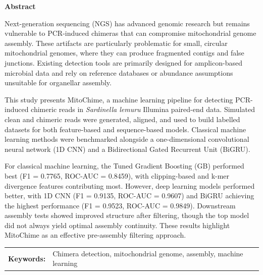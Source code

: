 
\begin{center}
\textbf{Abstract}
\end{center}

\setlength{\parindent}{0pt}
Next-generation sequencing (NGS) has advanced genomic research but remains vulnerable to PCR-induced chimeras that can compromise mitochondrial genome assembly. These artifacts are particularly problematic for small, circular mitochondrial genomes, where they can produce fragmented contigs and false junctions. Existing detection tools are primarily designed for amplicon-based microbial data and rely on reference databases or abundance assumptions unsuitable for organellar assembly.

This study presents MitoChime, a machine learning pipeline for detecting PCR-induced chimeric reads in \textit{Sardinella lemuru} Illumina paired-end data. Simulated clean and chimeric reads were generated, aligned, and used to build labelled datasets for both feature-based and sequence-based models. Classical machine learning methods were benchmarked alongside a one-dimensional convolutional neural network (1D CNN) and a Bidirectional Gated Recurrent Unit (BiGRU).

For classical machine learning, the Tuned Gradient Boosting (GB) performed best (F1 = 0.7765, ROC-AUC = 0.8459), with clipping-based and k-mer divergence features contributing most. However, deep learning models performed better, with 1D CNN (F1 = 0.9135, ROC-AUC = 0.9607) and BiGRU achieving the highest performance (F1 = 0.9523, ROC-AUC = 0.9849). Downstream assembly tests showed improved structure after filtering, though the top model did not always yield optimal assembly continuity. These results highlight MitoChime as an effective pre-assembly filtering approach.

\begin{tabular}{lp{4.25in}}
\hspace{-0.5em}\textbf{Keywords:}\hspace{0.25em} & Chimera detection, mitochondrial genome, assembly, machine learning
\end{tabular}